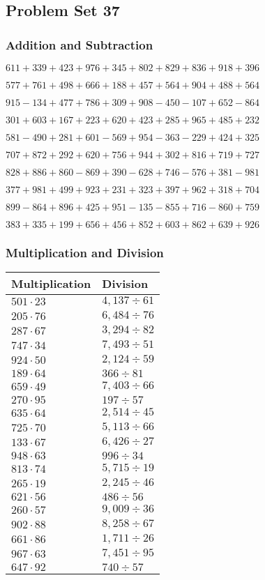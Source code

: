 \hypertarget{problem-set-37-2}{%
\subsection{Problem Set 37}\label{problem-set-37-2}}

\hypertarget{addition-and-subtraction-137}{%
\subsubsection{Addition and
Subtraction}\label{addition-and-subtraction-137}}

\(611 + 339 + 423 + 976 + 345 + 802 + 829 + 836 + 918 + 396\)

\(577 + 761 + 498 + 666 + 188 + 457 + 564 + 904 + 488 + 564\)

\(915 - 134 + 477 + 786 + 309 + 908 - 450 - 107 + 652 - 864\)

\(301 + 603 + 167 + 223 + 620 + 423 + 285 + 965 + 485 + 232\)

\(581 - 490 + 281 + 601 - 569 + 954 - 363 - 229 + 424 + 325\)

\(707 + 872 + 292 + 620 + 756 + 944 + 302 + 816 + 719 + 727\)

\(828 + 886 + 860 - 869 + 390 - 628 + 746 - 576 + 381 - 981\)

\(377 + 981 + 499 + 923 + 231 + 323 + 397 + 962 + 318 + 704\)

\(899 - 864 + 896 + 425 + 951 - 135 - 855 + 716 - 860 + 759\)

\(383 + 335 + 199 + 656 + 456 + 852 + 603 + 862 + 639 + 926\)

\hypertarget{multiplication-and-division-137}{%
\subsubsection{Multiplication and
Division}\label{multiplication-and-division-137}}

\begin{longtable}[]{@{}ll@{}}
\toprule
Multiplication & Division\tabularnewline
\midrule
\endhead
\(501 \cdot 23\) & \(4,137÷61\)\tabularnewline
\(205 \cdot 76\) & \(6,484÷76\)\tabularnewline
\(287 \cdot 67\) & \(3,294÷82\)\tabularnewline
\(747 \cdot 34\) & \(7,493÷51\)\tabularnewline
\(924 \cdot 50\) & \(2,124÷59\)\tabularnewline
\(189 \cdot 64\) & \(366÷81\)\tabularnewline
\(659 \cdot 49\) & \(7,403÷66\)\tabularnewline
\(270 \cdot 95\) & \(197÷57\)\tabularnewline
\(635 \cdot 64\) & \(2,514÷45\)\tabularnewline
\(725 \cdot 70\) & \(5,113÷66\)\tabularnewline
\(133 \cdot 67\) & \(6,426÷27\)\tabularnewline
\(948 \cdot 63\) & \(996÷34\)\tabularnewline
\(813 \cdot 74\) & \(5,715÷19\)\tabularnewline
\(265 \cdot 19\) & \(2,245÷46\)\tabularnewline
\(621 \cdot 56\) & \(486÷56\)\tabularnewline
\(260 \cdot 57\) & \(9,009÷36\)\tabularnewline
\(902 \cdot 88\) & \(8,258÷67\)\tabularnewline
\(661 \cdot 86\) & \(1,711÷26\)\tabularnewline
\(967 \cdot 63\) & \(7,451÷95\)\tabularnewline
\(647 \cdot 92\) & \(740÷57\)\tabularnewline
\bottomrule
\end{longtable}

